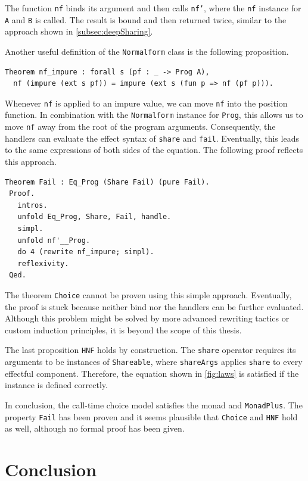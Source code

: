 \documentclass[a4paper, 11pt, fleqn, twoside, abstract=on]{scrreprt}
\newcommand{\hinl}[1]{\texttt{#1}}
\newcommand{\cinl}[1]{\texttt{#1}}
\begin{document}
The function \cinl{nf} binds its argument and then calls \cinl{nf'}, where the \cinl{nf} instance for \cinl{A} and \cinl{B} is called.
The result is bound and then returned twice, similar to the approach shown in \autoref{subsec:deepSharing}.

Another useful definition of the \cinl{Normalform} class is the following proposition.

\begin{verbatim}
Theorem nf_impure : forall s (pf : _ -> Prog A),
  nf (impure (ext s pf)) = impure (ext s (fun p => nf (pf p))).
\end{verbatim}

Whenever \cinl{nf} is applied to an impure value, we can move \cinl{nf} into the position function.
In combination with the \cinl{Normalform} instance for \cinl{Prog}, this allows us to move \cinl{nf} away from the root of the program arguments.
Consequently, the handlers can evaluate the effect syntax of \cinl{share} and \cinl{fail}.
Eventually, this leads to the same expressions of both sides of the equation.
The following proof reflects this approach.

\begin{verbatim}
Theorem Fail : Eq_Prog (Share Fail) (pure Fail).
 Proof.
   intros.
   unfold Eq_Prog, Share, Fail, handle.
   simpl.
   unfold nf'__Prog.
   do 4 (rewrite nf_impure; simpl).
   reflexivity.
 Qed.
\end{verbatim}

The theorem \cinl{Choice} cannot be proven using this simple approach.
Eventually, the proof is stuck because neither bind nor the handlers can be further evaluated.
Although this problem might be solved by more advanced rewriting tactics or custom induction principles, it is beyond the scope of this thesis.

The last proposition \cinl{HNF} holds by construction.
The \cinl{share} operator requires its arguments to be instances of \cinl{Shareable}, where \cinl{shareArgs} applies \cinl{share} to every effectful component.
Therefore, the equation shown in \autoref{fig:laws} is satisfied if the instance is defined correctly.

In conclusion, the call-time choice model satisfies the monad and \hinl{MonadPlus}.
The property \cinl{Fail} has been proven and it seems plausible that \cinl{Choice} and \cinl{HNF} hold as well, although no formal proof has been given.

\chapter{Conclusion}
\label{ch:conclusion}
\end{document}
